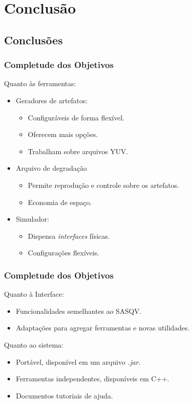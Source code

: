 \section{Conclusão}

\subsection{Conclusões}
    \begin{frame}\frametitle{Completude dos Objetivos}
	Quanto às ferramentas:
	\begin{itemize}
		\item Geradores de artefatos:
		\begin{itemize}
			\item Configuráveis de forma flexível.
			\item Oferecem mais opções.
			\item Trabalham sobre arquivos YUV.
		\end{itemize}
		\item{Arquivo de degradação}
		\begin{itemize}
			\item Permite reprodução e controle sobre os artefatos.
			\item Economia de espaço.
		\end{itemize}
		\item Simulador:
		\begin{itemize}
			\item Dispensa \emph{interfaces} físicas.
			\item Configurações flexíveis.
		\end{itemize}
	\end{itemize}
    \end{frame}

	\begin{frame}\frametitle{Completude dos Objetivos}
	Quanto à Interface:
	\begin{itemize}
		\item Funcionalidades semelhantes ao SASQV.
		\item Adaptações para agregar ferramentas e novas utilidades.
	\end{itemize}
	Quanto ao sistema:
	\begin{itemize}
		\item Portável, disponível em um arquivo \emph{.jar}.
		\item Ferramentas independentes, disponíveis em C++.
		\item Documentos tutoriais de ajuda. %
	\end{itemize}
	\end{frame}
    
